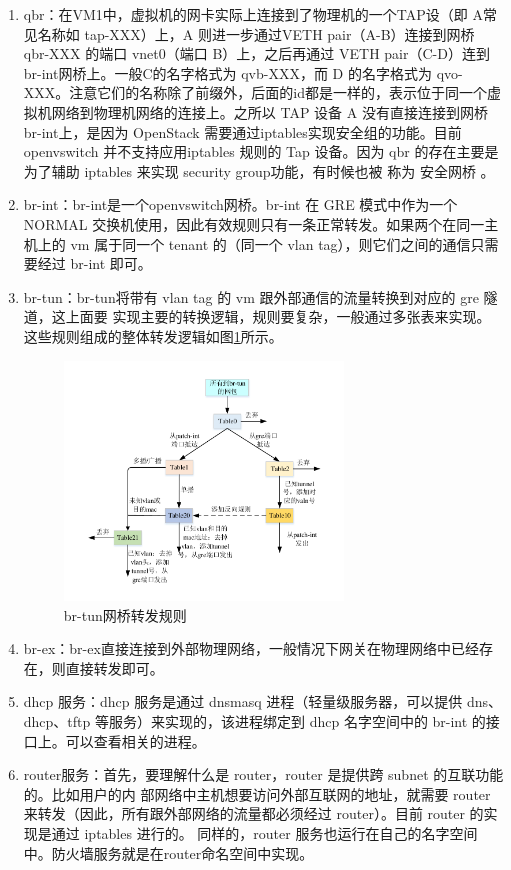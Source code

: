 \begin{enumerate}
\item qbr：在VM1中，虚拟机的网卡实际上连接到了物理机的一个TAP设（即 A常见名称如 tap-XXX）上，A 则进一步通过VETH pair（A-B）连接到网桥 qbr-XXX 的端口 vnet0（端口 B）上，之后再通过 VETH pair（C-D）连到br-int网桥上。一般C的名字格式为 qvb-XXX，而 D 的名字格式为 qvo-XXX。注意它们的名称除了前缀外，后面的id都是一样的，表示位于同一个虚拟机网络到物理机网络的连接上。之所以 TAP 设备 A 没有直接连接到网桥br-int上，是因为 OpenStack 需要通过iptables实现安全组的功能。目前 openvswitch 并不支持应用iptables 规则的 Tap 设备。因为 qbr 的存在主要是为了辅助 iptables 来实现 security group功能，有时候也被
称为 安全网桥 。
\item br-int：br-int是一个openvswitch网桥。br-int 在 GRE 模式中作为一个 NORMAL 交换机使用，因此有效规则只有一条正常转发。如果两个在同一主机上的 vm 属于同一个 tenant 的（同一个 vlan tag），则它们之间的通信只需要经过 br-int 即可。
\item br-tun：br-tun将带有 vlan tag 的 vm 跟外部通信的流量转换到对应的 gre 隧道，这上面要
实现主要的转换逻辑，规则要复杂，一般通过多张表来实现。这些规则组成的整体转发逻辑如图\ref{fig:br-tun}所示。

\begin{figure}[!htb]
  \centering
  \includegraphics[width=0.7\textwidth]{logo/br-tun}
  \caption{br-tun网桥转发规则}
  \label{fig:br-tun}
\end{figure}

\item br-ex：br-ex直接连接到外部物理网络，一般情况下网关在物理网络中已经存在，则直接转发即可。
\item dhcp 服务：dhcp 服务是通过 dnsmasq 进程（轻量级服务器，可以提供 dns、dhcp、tftp 等服务）来实现的，该进程绑定到 dhcp 名字空间中的 br-int 的接口上。可以查看相关的进程。
\item router服务：首先，要理解什么是 router，router 是提供跨 subnet 的互联功能的。比如用户的内
部网络中主机想要访问外部互联网的地址，就需要 router 来转发（因此，所有跟外部网络的流量都必须经过 router）。目前 router 的实现是通过 iptables 进行的。 同样的，router 服务也运行在自己的名字空间中。防火墙服务就是在router命名空间中实现。

\end{enumerate}

